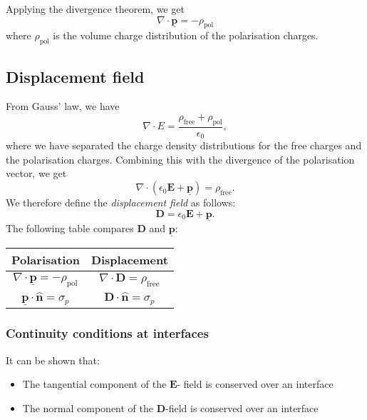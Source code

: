 \documentclass[a4paper, 12pt]{article}
\renewcommand{\vec}[1]{\bm{#1}}
\newcommand{\E}{\ensuremath{\vec{E}}}
\newcommand{\e}{\ensuremath{\epsilon_0}}
\newcommand{\p}{\ensuremath{\vec{\underline{p}}}}
\newcommand{\D}{\ensuremath{\vec{D}}}
\let\tmp\hat
\renewcommand{\hat}[1]{\vec{\tmp{#1}}}
\begin{document}
        Applying the divergence theorem, we get
        \begin{equation}
            \nabla \cdot \p = - \rho_{\text{pol}}
        \end{equation}
        where $\rho_{\text{pol}}$ is the volume charge distribution of the polarisation charges.

\subsection{Displacement field}
    From Gauss' law, we have 
    \begin{equation*}
        \nabla \cdot E = \frac{\rho_{\text{free}} + \rho_{\text{pol}}}{\e},
    \end{equation*}
    where we have separated the charge density distributions for the free charges and the polarisation charges. 
    Combining this with the divergence of the polarisation vector, we get 
    \begin{equation*}
        \nabla \cdot \left(\e\E + \p\right) = \rho_{\text{free}}.
    \end{equation*}
    We therefore define the \textit{displacement field} as follows:
    \begin{equation}
        \D = \e\E + \p.
    \end{equation}
    The following table compares $\D$ and $\p$:
    \begin{center}
        \begin{tabular}{ c|c } 
        Polarisation & Displacement \\
        \hline
         $\nabla \cdot \p = -\rho_{\text{pol}}$ & $\nabla \cdot \D = \rho_{\text{free}}$ \\
         $\p \cdot \hat{n} = \sigma_p$ & $\D \cdot \hat{n} = \sigma_p$
        \end{tabular}
    \end{center}

    \subsubsection{Continuity conditions at interfaces}
        It can be shown that:
        \begin{itemize}
            \item The tangential component of the $\E$- field is conserved over an interface
            \item The normal component of the $\D$-field is conserved over an interface
        \end{itemize}
\end{document}

